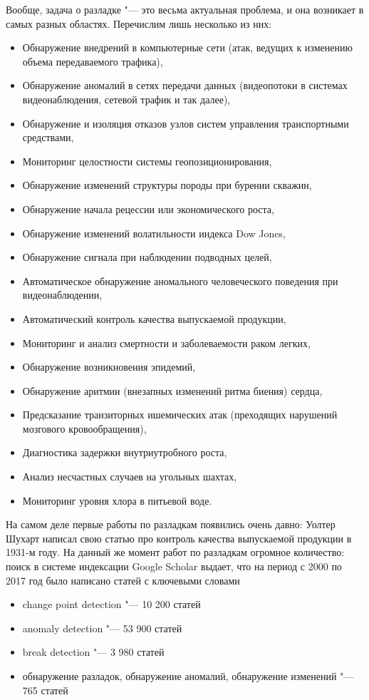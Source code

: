 Вообще, задача о разладке "--- это весьма актуальная проблема, и она возникает в самых разных областях. 
Перечислим лишь несколько из них:
\begin{itemize}
	\item Обнаружение внедрений в компьютерные сети (атак, ведущих к изменению объема передаваемого трафика),
	\item Обнаружение аномалий в сетях передачи данных (видеопотоки в системах видеонаблюдения, сетевой трафик и так далее),
	\item Обнаружение и изоляция отказов узлов систем управления транспортными средствами,
	\item Мониторинг целостности системы геопозиционирования,
	\item Обнаружение изменений структуры породы при бурении скважин,
	\item Обнаружение начала рецессии или экономического роста,
	\item Обнаружение изменений волатильности индекса Dow Jones,
	\item Обнаружение сигнала при наблюдении подводных целей,
	\item Автоматическое обнаружение аномального человеческого поведения при видеонаблюдении,
	\item Автоматический контроль качества выпускаемой продукции,
	\item Мониторинг и анализ смертности и заболеваемости раком легких,
	\item Обнаружение возникновения эпидемий,
	\item Обнаружение аритмии (внезапных изменений ритма биения) сердца,
	\item Предсказание транзиторных ишемических атак (преходящих нарушений мозгового кровообращения),
	\item Диагностика задержки внутриутробного роста,
	\item Анализ несчастных случаев на угольных шахтах,
	\item Мониторинг уровня хлора в питьевой воде.
\end{itemize}

На самом деле первые работы по разладкам появились очень давно: Уолтер Шухарт написал свою статью про контроль качества выпускаемой продукции в 1931-м году. 
На данный же момент работ по разладкам огромное количество: поиск в системе индексации Google Scholar выдает, что на период с 2000 по 2017 год было написано статей с ключевыми словами
\begin{itemize}
	\item change point detection "--- 10 200 статей
	\item anomaly detection "--- 53 900 статей
	\item break detection "--- 3 980 статей
	\item обнаружение разладок, обнаружение аномалий, обнаружение изменений "--- 765 статей
\end{itemize}

